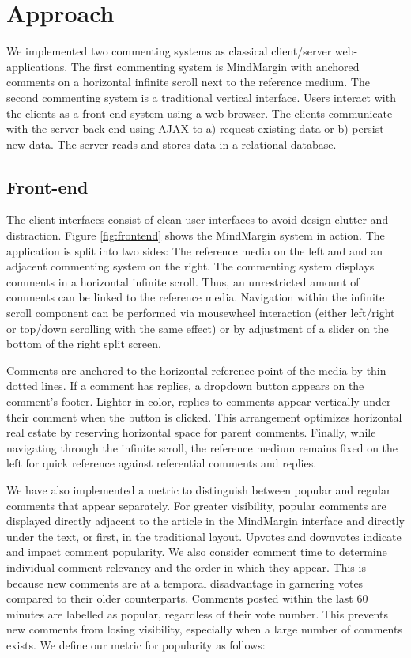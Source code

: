\section {Approach}

We implemented two commenting systems as classical client/server web-applications. The first commenting system is MindMargin with anchored comments on a horizontal infinite scroll next to the reference medium. The second commenting system is a traditional vertical interface. Users interact with the clients as a front-end system using a web browser. The clients communicate with the server back-end using AJAX to a) request existing data or b) persist new data. The server reads and stores data in a relational database.

\subsection{Front-end}
The client interfaces consist of clean user interfaces to avoid design clutter and distraction. Figure \ref{fig:frontend} shows the MindMargin system in action. The application is split into two sides: The reference media on the left and and an adjacent commenting system on the right. The commenting system displays comments in a horizontal infinite scroll. Thus, an unrestricted amount of comments can be linked to the reference media. Navigation within the infinite scroll component can be performed via mousewheel interaction (either left/right or top/down scrolling with the same effect) or by adjustment of a slider on the bottom of the right split screen. 

Comments are anchored to the horizontal reference point of the media by thin dotted lines. If a comment has replies, a dropdown button appears on the comment's footer. Lighter in color, replies to comments appear vertically under their comment when the button is clicked. This arrangement optimizes horizontal real estate by reserving horizontal space for parent comments. Finally, while navigating through the infinite scroll, the reference medium remains fixed on the left for quick reference against referential comments and replies.

We have also implemented a metric to distinguish between popular and regular comments that appear separately. For greater visibility, popular comments are displayed directly adjacent to the article in the MindMargin interface and directly under the text, or first, in the traditional layout. Upvotes and downvotes indicate and impact comment popularity. We also consider comment time to determine individual comment relevancy and the order in which they appear. This is because new comments are at a temporal disadvantage in garnering votes compared to their older counterparts. Comments posted within the last 60 minutes are labelled as popular, regardless of their vote number. This prevents new comments from losing visibility, especially when a large number of comments exists. We define our metric for popularity as follows:

